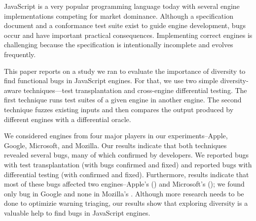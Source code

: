 JavaScript is a very popular programming language today with several
engine implementations competing for market dominance. Although a
specification document and a conformance test suite exist to guide
engine development, bugs occur and have important practical
consequences. Implementing correct
engines is challenging because the specification is intentionally
incomplete and evolves frequently.

This paper reports on a study we ran to evaluate the importance of
diversity to find functional bugs in JavaScript engines. For that, we
use two simple diversity-aware techniques---test transplantation and
cross-engine differential testing. The first technique runs test
suites of a given engine in another engine. The second technique
fuzzes existing inputs and then compares the output produced by
different engines with a differential oracle.

We considered engines from four major players in our
experiments--Apple, Google, Microsoft, and Mozilla. Our results
indicate that both techniques revealed several bugs, many of which
confirmed by developers. We reported \noBugsTransplantation{} bugs
with test transplantation (with \noBugsTransplantationConfirmed{} bugs
confirmed and \noBugsTransplantationFixed{} fixed) and reported
\noBugsDifferentialTesting{} bugs with differential testing
(with \noBugsDifferentialTestingConfirmed{} confirmed
and \noBugsDifferentialTestingFixed{} fixed). Furthermore, results
indicate that most of these bugs affected two engines--Apple's
\jsc{} (\percJSC{}) and Microsoft's \chakra{} (\percChakra{}); we found
only  bug in Google \veight{} and none in Mozilla's
\smonkey{}. Although more research needs to be done to optimizie 
warning triaging, our results show that exploring diversity is a
valuable help to find bugs in JavaScript engines.
